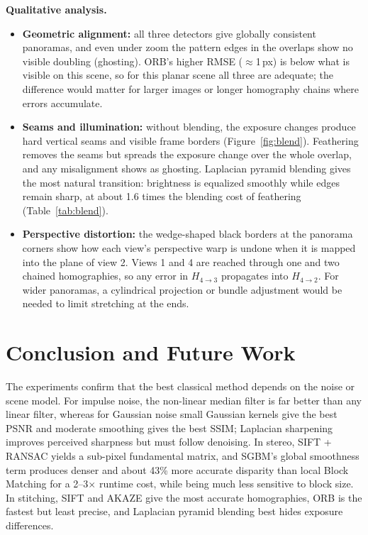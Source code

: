 \documentclass[a4paper,12pt]{article}
\begin{document}
\textbf{Qualitative analysis.}
\begin{itemize}[leftmargin=*]
    \item \textbf{Geometric alignment:} all three detectors give globally consistent panoramas, and
          even under zoom the pattern edges in the overlaps show no visible doubling (ghosting). ORB's
          higher RMSE ($\approx$1\,px) is below what is visible on this scene, so for this planar
          scene all three are adequate; the difference would matter for larger images or longer
          homography chains where errors accumulate.
    \item \textbf{Seams and illumination:} without blending, the exposure changes produce hard
          vertical seams and visible frame borders (Figure~\ref{fig:blend}). Feathering removes the
          seams but spreads the exposure change over the whole overlap, and any misalignment shows as
          ghosting. Laplacian pyramid blending gives the most natural transition: brightness is
          equalized smoothly while edges remain sharp, at about 1.6 times the blending cost of
          feathering (Table~\ref{tab:blend}).
    \item \textbf{Perspective distortion:} the wedge-shaped black borders at the panorama corners show
          how each view's perspective warp is undone when it is mapped into the plane of view 2.
          Views 1 and 4 are reached through one and two chained homographies, so any error in
          $H_{4\to3}$ propagates into $H_{4\to2}$. For wider panoramas, a cylindrical projection or
          bundle adjustment would be needed to limit stretching at the ends.
\end{itemize}

\section{Conclusion and Future Work}\label{sec:conclusion}
The experiments confirm that the best classical method depends on the noise or scene model. For
impulse noise, the non-linear median filter is far better than any linear filter, whereas for
Gaussian noise small Gaussian kernels give the best PSNR and moderate smoothing gives the best
SSIM; Laplacian sharpening improves perceived sharpness but must follow denoising. In stereo,
SIFT + RANSAC yields a sub-pixel fundamental matrix, and SGBM's global smoothness term produces
denser and about 43\% more accurate disparity than local Block Matching for a 2--3$\times$ runtime
cost, while being much less sensitive to block size. In stitching, SIFT and AKAZE give the most
accurate homographies, ORB is the fastest but least precise, and Laplacian pyramid blending best
hides exposure differences.
\end{document}
